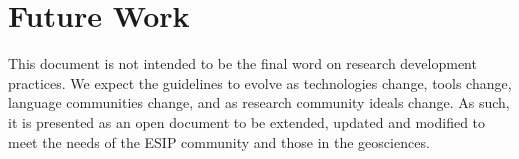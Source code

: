 \documentclass{article}
\begin{document}
\section{Future Work}
This document is not intended to be the final word on research development practices. We expect the guidelines to evolve as technologies change, tools change, language communities change, and as research community ideals change. As such, it is presented as an open document to be extended, updated and modified to meet the needs of the ESIP community and those in the geosciences.
\end{document}
